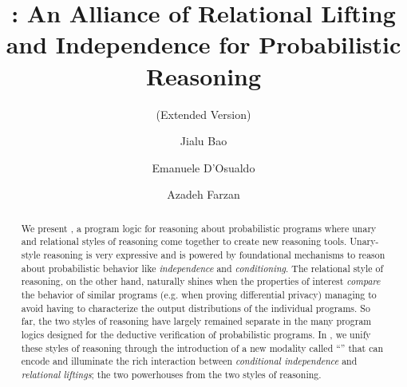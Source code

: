 \documentclass[acmsmall,nonacm,screen,appendix]{acmart}
\begin{document}
\title{\thelogic: An Alliance of Relational Lifting and Independence for Probabilistic Reasoning}
\ifappendix
  \subtitle{(Extended Version)}
\fi

\author{Jialu Bao}
\author{Emanuele D'Osualdo}
\author{Azadeh Farzan}




\begin{abstract}
We present \thelogic, a program logic for reasoning about probabilistic programs where unary and relational styles of reasoning come together to create new reasoning tools.
Unary-style reasoning is very expressive and is powered by foundational mechanisms to reason about probabilistic behavior like \emph{independence} and \emph{conditioning}.
The relational style of reasoning, on the other hand, naturally shines when the properties of interest \emph{compare} the behavior of similar programs
(e.g. when proving differential privacy)
managing to avoid having to characterize the output distributions of the individual programs.
So far, the two styles of reasoning
have largely remained separate in the many program logics designed for the deductive verification of probabilistic programs.
In \thelogic, we unify these styles of reasoning through the introduction of a new modality called ``\supercond'' that can encode and illuminate the rich interaction between \emph{conditional independence} and \emph{relational liftings};
the two powerhouses from the two styles of reasoning.
\end{abstract}
\end{document}
